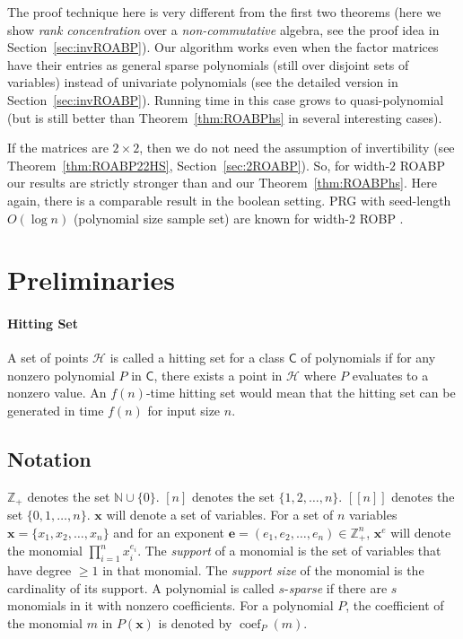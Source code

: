 \documentclass[final,oneeqnum, onethmnum, onefignum]{siamltex1213}
\newcommand{\N}{\mathbb N}
\newcommand{\Zp}{\mathbb{Z}_+}
\newcommand{\Hit}{\mathcal{H}} %
\newcommand{\coeff}{\operatorname{coef}}
\newcommand{\x}{\mathbf{x}}
\newcommand{\xe}{\mathbf{x}^e}
\begin{document}
The proof technique here is very different from the first two theorems 
(here we show {\em rank concentration} over a {\em non-commutative} algebra, 
see the proof idea in Section~\ref{sec:invROABP}).
Our algorithm works even when the factor matrices have their entries as general sparse 
polynomials (still over disjoint sets of variables) instead of 
univariate polynomials (see the detailed version in Section~\ref{sec:invROABP}).
Running time in this case grows to quasi-polynomial (but is still better
than Theorem~\ref{thm:ROABPhs} in several interesting cases).

If the matrices are $2 \times 2$, then we do not need the assumption
of invertibility (see Theorem~\ref{thm:ROABP22HS}, Section~\ref{sec:2ROABP}).
So, for width-$2$ ROABP our results are strictly stronger than \cite{FSS13}
and our Theorem~\ref{thm:ROABPhs}.
Here again, there is a comparable result in the boolean setting. 
PRG with seed-length $O(\log n)$ (polynomial size sample set) are known 
for width-$2$ ROBP \cite{BDVY13}.  

   

	
\section{Preliminaries}
\label{sec:preliminaries}
\paragraph{Hitting Set} A set of points $\Hit$ is called a hitting set
for a class $\mathsf{C}$ of polynomials if for any nonzero polynomial $P$
in $\mathsf{C}$, there exists a point in $\Hit$ where $P$ evaluates to a nonzero
value. 
An $f(n)$-time hitting set would mean that the hitting set can be generated 
in time $f(n)$ for input size $n$.

\subsection{Notation}
$\Zp$ denotes the set $\N \cup \{0\}$.
$[n]$ denotes the set $\{1,2, \dots, n\}$. 
$[[n]]$ denotes the set $\{0,1, \dots, n\}$. 
$\mathbf{x}$ will denote a set of variables.
For a set of $n$ variables $\mathbf{x} = \{x_1, x_2, \dots, x_n\}$
and for an exponent $\mathbf{e} = (e_1, e_2, \dots, e_n) \in \Zp^n$,
$\xe$ will denote the monomial $\prod_{i=1}^n x_i^{e_i}$.
The \emph{support} of a monomial is the set of 
variables that have degree $ \ge 1 $ in that monomial. 
The \emph{support size }of the monomial is the cardinality of its support. 
A polynomial is called $s$-{\em sparse} if there are $s$ monomials in it
with nonzero coefficients.
For a polynomial $P$, the coefficient of the monomial $m$ in $P(\x)$ 
is denoted by $\coeff_P(m)$.
\end{document}
